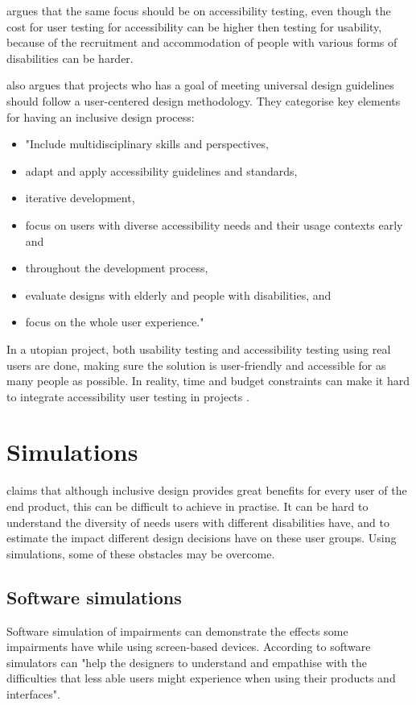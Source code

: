 \textcite{bai2017cost} argues that the same focus should be on accessibility testing, even though the cost for user testing for accessibility can be higher then testing for usability, because of the recruitment and accommodation of people with various forms of disabilities can be harder.  

\textcite{fuglerud_link_2013} also argues that projects who has a goal of meeting universal design guidelines should follow a user-centered design methodology. They categorise key elements for having an inclusive design process:
\begin{itemize}
\item "Include multidisciplinary skills and perspectives, 
\item adapt and apply accessibility guidelines and standards,   
\item iterative development, 
\item focus  on  users  with  diverse  accessibility  needs  and  their  usage  contexts  early  and  
\item throughout the development process, 
\item evaluate designs with elderly and people with disabilities, and 
\item focus on the whole user experience."
\end{itemize}


In a utopian project, both usability testing and accessibility testing using real users are done, making sure the solution is user-friendly and accessible for as many people as possible. In reality, time and budget constraints can make it hard to integrate accessibility user testing in projects \parencite{bai_evaluation_2016}. 

\section{Simulations}
\textcite{GoodmanDeane:2007it} claims that although inclusive design provides great benefits for every user of the end product, this can be difficult to achieve in practise. It can be hard to understand the diversity of needs users with different disabilities have, and to estimate the impact different design decisions have on these user groups. Using simulations, some of these obstacles may be overcome.

\subsection{Software simulations}
Software simulation of impairments can demonstrate the effects some impairments have while using screen-based devices. According to \textcite{GoodmanDeane:2007it} software simulators can "help the designers to understand and empathise with the difficulties that less able users might experience when using their products and interfaces". 

